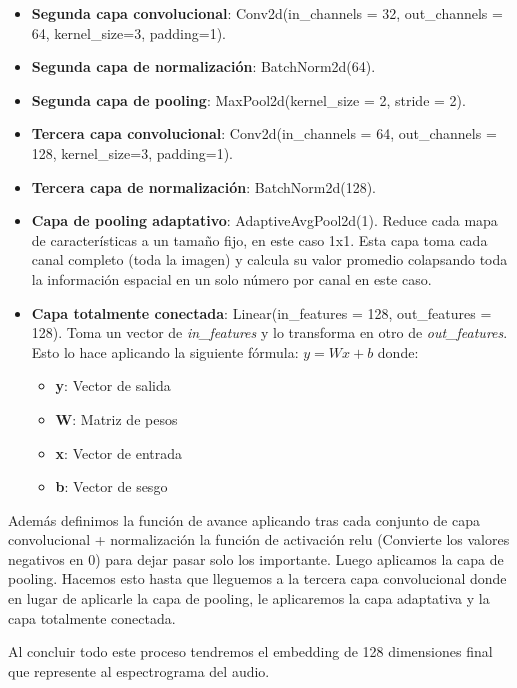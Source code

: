 \begin{itemize}
	\item \textbf{Segunda capa convolucional}: Conv2d(in\_channels = 32, out\_channels = 64, kernel\_size=3, padding=1).
	
	\item \textbf{Segunda capa de normalización}: BatchNorm2d(64).
	
	\item \textbf{Segunda capa de pooling}: MaxPool2d(kernel\_size = 2, stride = 2).
	
	\item \textbf{Tercera capa convolucional}: Conv2d(in\_channels = 64, out\_channels = 128, kernel\_size=3, padding=1).
	
	\item \textbf{Tercera capa de normalización}: BatchNorm2d(128).
	
	\item \textbf{Capa de pooling adaptativo}: AdaptiveAvgPool2d(1).
	Reduce cada mapa de características a un tamaño fijo, en este caso 1x1. Esta capa toma cada canal completo (toda la imagen) y calcula su valor promedio colapsando toda la información espacial en un solo número por canal en este caso.
	
	\item \textbf{Capa totalmente conectada}: Linear(in\_features = 128, out\_features = 128). Toma un vector de \textit{in\_features} y lo transforma en otro de \textit{out\_features}. Esto lo hace aplicando la siguiente fórmula: $y = W x + b$ donde:
	\begin{itemize}
	  \item \textbf{y}: Vector de salida
	  \item \textbf{W}: Matriz de pesos
	  \item \textbf{x}: Vector de entrada
	  \item \textbf{b}: Vector de sesgo
	\end{itemize}
\end{itemize}

Además definimos la función de avance aplicando tras cada conjunto de capa convolucional + normalización la función de activación relu (Convierte los valores negativos en 0) para dejar pasar solo los importante. Luego aplicamos la capa de pooling. Hacemos esto hasta que lleguemos a la tercera capa convolucional donde en lugar de aplicarle la capa de pooling, le aplicaremos la capa adaptativa y la capa totalmente conectada.

Al concluir todo este proceso tendremos el embedding de 128 dimensiones final que represente al espectrograma del audio.

